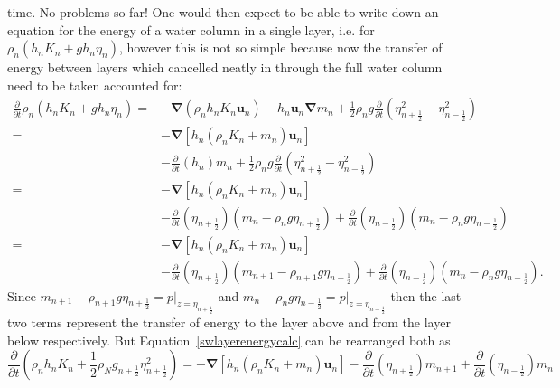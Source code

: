 \documentclass[12pt,a4paper]{report}
\newcommand*\equref[1]{Equation~\eqref{#1}}
\newcommand*{\half}{\frac{1}{2}}
\begin{document}
    time. No problems so far! One would then expect to be able to write down
    an equation for the energy of a water column in a single layer, i.e. for 
    $\rho_{n}\left(h_{n} K_{n}+ g h_{n}\eta_{n}\right)$, however this is not
    so simple because now the transfer of energy between layers which cancelled neatly
    in through the full water column need to be taken accounted for:
    \begin{equation}
    \label{swlayerenergycalc}
    \begin{split}
    \frac{\partial}{\partial t}\rho_{n}\left(h_{n} K_{n}+ g h_{n}\eta_{n}\right) 
    =& - \boldsymbol{\nabla} \left(\rho_{n} h_{n} K_{n} \boldsymbol{u}_{n}\right) 
    - h_{n} \boldsymbol{u}_{n}  \boldsymbol{\nabla} m_{n}
    +\half  \rho_{n} g \frac{\partial}{\partial t}\left(\eta_{n+\half }^{2} -\eta_{n-\half }^{2}\right) \\
    =& - \boldsymbol{\nabla} \left[h_{n}  \left(\rho_{n}K_{n}+ m_{n}\right) \boldsymbol{u}_{n}\right] \\
    &- \frac{\partial}{\partial t}\left(h_{n}\right)   m_{n}
    +\half  \rho_{n} g \frac{\partial}{\partial t}\left(\eta_{n+\half }^{2} -\eta_{n-\half }^{2}\right) \\
    =& -\boldsymbol{\nabla} \left[h_{n} \left(\rho_{n}K_{n}+m_{n}\right) \boldsymbol{u}_{n}\right] \\
    &- \frac{\partial}{\partial t}\left(\eta_{n+\half }\right)\left(   m_{n}- \rho_{n}g \eta_{n+\half }\right) 
    + \frac{\partial}{\partial t}\left(\eta_{n-\half }\right)\left(   m_{n}- \rho_{n}g \eta_{n-\half }\right) \\
    =& -\boldsymbol{\nabla} \left[h_{n} \left(\rho_{n}K_{n}+m_{n}\right) \boldsymbol{u}_{n}\right] \\
    &- \frac{\partial}{\partial t}\left(\eta_{n+\half }\right)\left(   m_{n+1} - \rho_{n+1}g \eta_{n+\half }\right) 
    + \frac{\partial}{\partial t}\left(\eta_{n-\half }\right)\left(   m_{n}- \rho_{n}g \eta_{n-\half }\right).
    \end{split}
    \end{equation}
    Since $m_{n+1} - \rho_{n+1}g \eta_{n+\half }=p\rvert_{z=\eta_{n+\half }}$ and
    $m_{n} - \rho_{n}g \eta_{n-\half }=p\rvert_{z=\eta_{n-\half }}$ then the last
    two terms represent the transfer of energy to the layer above and from the layer below
    respectively. But \equref{swlayerenergycalc}
    can be rearranged both as
    \begin{equation}
    \frac{\partial}{\partial t}\left(\rho_{n} h_{n} K_{n}+ 
    \half \rho_{N} g_{n+\half }\eta_{n+\half }^{2} \right) 
    = -\boldsymbol{\nabla} \left[h_{n} \left(\rho_{n}K_{n}+m_{n}\right) \boldsymbol{u}_{n}\right] 
    - \frac{\partial}{\partial t}\left(\eta_{n+\half }\right)   m_{n+1}
    + \frac{\partial}{\partial t}\left(\eta_{n-\half }\right) m_{n}
    \label{swlayercorrectenergy}
    \end{equation}
\end{document}
